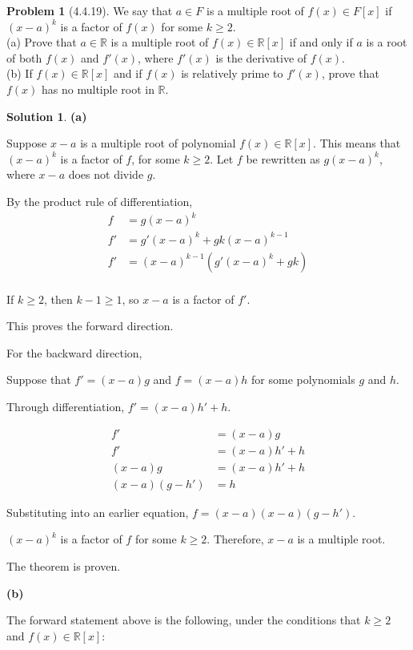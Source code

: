 \documentclass[12pt]{article}
\theoremstyle{definition}
\newtheorem*{prob}{Problem}
\newtheorem*{soln}{Solution}
\newcommand{\RR}{{\mathbb{R}}}
\begin{document}
\begin{prob}[4.4.19]
We say that $a \in F$ is a multiple root of  $f(x) \in F[x]$ if  
$(x - a)^k$ is a factor of  $f(x)$ for some $k \geq 2$. \\
(a)   Prove that $a \in \RR$ is a multiple root of  $f(x)\in \RR[x]$ 
if and only if  $a$ is a root of both $f(x)$ and $f'(x)$, where $f'(x)$ 
is the derivative of  $f(x)$.\\
(b)   If  $f(x) \in  \RR[x]$ and if $f(x)$ is relatively prime to $f'(x)$,
 prove that $f(x)$ has no multiple root in $\RR$.
\end{prob}

\begin{soln}

\textbf{(a)}

Suppose $x-a$ is a multiple root of polynomial $f(x)\in\RR[x]$.
This means that $(x-a)^k$ is a factor of $f$, for some $k\geq2$.
Let $f$ be rewritten as $g(x-a)^k$,
where $x-a$ does not divide $g$.

By the product rule of differentiation,
\begin{align*}
f&=g(x-a)^k\\
f'&=g'(x-a)^k + gk(x-a)^{k-1}\\
f'&=(x-a)^{k-1}(g'(x-a)^k+gk)\\
\end{align*}

If $k\geq 2$, then $k-1\geq 1$, so $x-a$ is a factor of $f'$.

This proves the forward direction.

For the backward direction,

Suppose that $f'=(x-a)g$ and $f=(x-a)h$ for some polynomials $g$ and $h$.

Through differentiation, $f'=(x-a)h'+h$.

\begin{align*}
f'&=(x-a)g\\
f'&=(x-a)h'+h\\
(x-a)g&=(x-a)h'+h\\
(x-a)(g-h')&=h
\end{align*}


Substituting into an earlier equation,
$f=(x-a)(x-a)(g-h')$.

$(x-a)^k$ is a factor of $f$ for some $k\geq 2$.
Therefore, $x-a$ is a multiple root.

The theorem is proven.

\textbf{(b)}

The forward statement above is the following, under the conditions
that $k\geq 2$ and $f(x)\in\RR[x]$:


\end{soln}
\end{document}
